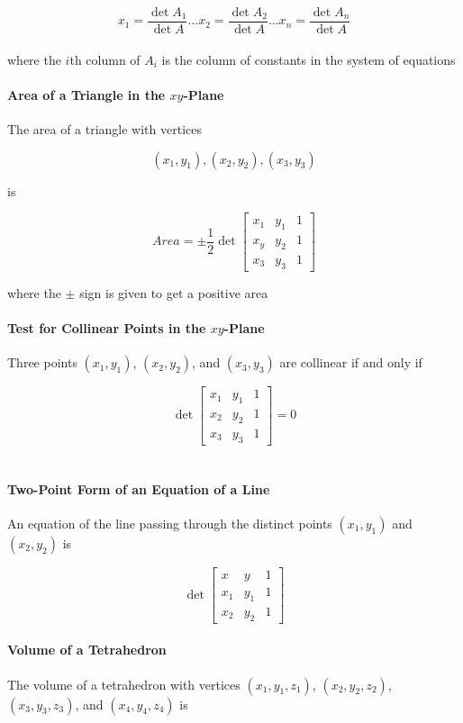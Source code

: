 \documentclass{report}
\begin{document}
$$
x_1 = \frac{\det{A_1}}{\det{A}} \hdots x_2 = \frac{\det{A_2}}{\det{A}} \hdots x_n = \frac{\det{A_n}}{\det{A}}
$$\\

\noindent where the $i$th column of $A_i$ is the column of constants in the system of equations

\paragraph{Area of a Triangle in the $xy$-Plane} The area of a triangle with vertices

$$
(x_1,y_1), (x_2,y_2), (x_3,y_3)
$$

\noindent is

\[
Area
=
\pm
\frac{1}{2}
\det{
\begin{bmatrix}
    x_1 & y_1 & 1 \\
    x_y & y_2 & 1 \\
    x_3 & y_3 & 1
\end{bmatrix}
}
\]

where the $\pm$ sign is given to get a positive area

\paragraph{Test for Collinear Points in the $xy$-Plane} Three points $(x_1,y_1)$, $(x_2,y_2)$, and $(x_3,y_3)$ are collinear if and only if

\[
\det{
\begin{bmatrix}
    x_1 & y_1 & 1 \\
    x_2 & y_2 & 1 \\
    x_3 & y_3 & 1 
\end{bmatrix}
}
=
0
\]\\

\paragraph{Two-Point Form of an Equation of a Line} An equation of the line passing through the distinct points $(x_1,y_1)$ and $(x_2,y_2)$ is

$$
\det{
\begin{bmatrix}
    x & y & 1 \\
    x_1 & y_1 & 1 \\
    x_2 & y_2 & 1
\end{bmatrix}
}
$$

\paragraph{Volume of a Tetrahedron} The volume of a tetrahedron with vertices $(x_1,y_1,z_1)$, $(x_2,y_2,z_2)$, $(x_3,y_3,z_3)$, and $(x_4,y_4,z_4)$ is 
\end{document}
